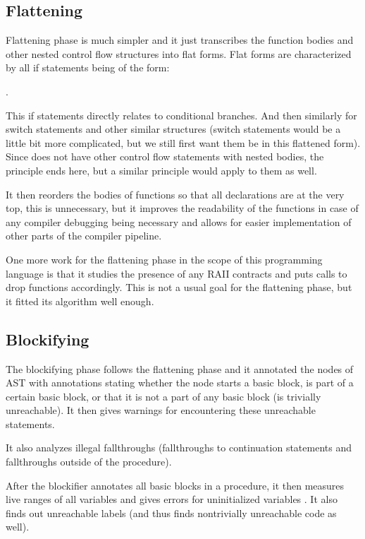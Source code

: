 \subsection{Flattening}

Flattening phase is much simpler and it just transcribes the function bodies and other nested control flow structures into flat forms. Flat forms are characterized by all if statements being of the form:

.

This if statements directly relates to conditional branches. And then similarly for switch statements and other similar structures (switch statements would be a little bit more complicated, but we still first want them be in this flattened form). Since \cmm does not have other control flow statements with nested bodies, the principle ends here, but a similar principle would apply to them as well.

It then reorders the bodies of functions so that all declarations are at the very top, this is unnecessary, but it improves the readability of the functions in case of any compiler debugging being necessary and allows for easier implementation of other parts of the compiler pipeline.

One more work for the flattening phase in the scope of this programming language is that it studies the presence of any RAII contracts and puts calls to drop functions accordingly. This is not a usual goal for the flattening phase, but it fitted its algorithm well enough.

\subsection{Blockifying}

The blockifying phase follows the flattening phase and it annotated the nodes of AST with annotations stating whether the node starts a basic block, is part of a certain basic block, or that it is not a part of any basic block (is trivially unreachable). It then gives warnings for encountering these unreachable statements.

It also analyzes illegal fallthroughs (fallthroughs to continuation statements and fallthroughs outside of the procedure).



After the blockifier annotates all basic blocks in a procedure, it then measures live ranges of all variables and gives errors for uninitialized variables . It also finds out unreachable labels (and thus finds nontrivially unreachable code as well).

